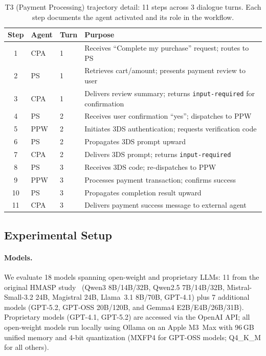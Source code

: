 \begin{table}[htbp]
    \centering
    \caption{T3 (Payment Processing) trajectory detail: 11 steps across 3 dialogue turns. Each step documents the agent activated and its role in the workflow.}
    \label{tab:t3_trajectory_detail}
    \footnotesize
    \renewcommand{\arraystretch}{1.05}
    \setlength{\tabcolsep}{1.5mm}
    \begin{tabular}{c l l p{7cm}}
        \toprule
        \textbf{Step} & \textbf{Agent} & \textbf{Turn} & \textbf{Purpose} \\
        \midrule
        1  & CPA & 1 & Receives ``Complete my purchase'' request; routes to PS \\
        2  & PS  & 1 & Retrieves cart/amount; presents payment review to user \\
        3  & CPA & 1 & Delivers review summary; returns \texttt{input-required} for confirmation \\
        4  & PS  & 2 & Receives user confirmation ``yes''; dispatches to PPW \\
        5  & PPW & 2 & Initiates 3DS authentication; requests verification code \\
        6  & PS  & 2 & Propagates 3DS prompt upward \\
        7  & CPA & 2 & Delivers 3DS prompt; returns \texttt{input-required} \\
        8  & PS  & 3 & Receives 3DS code; re-dispatches to PPW \\
        9  & PPW & 3 & Processes payment transaction; confirms success \\
        10 & PS  & 3 & Propagates completion result upward \\
        11 & CPA & 3 & Delivers payment success message to external agent \\
        \bottomrule
    \end{tabular}
\end{table}

\subsection{Experimental Setup}

\paragraph{Models.} We evaluate 18 models spanning open-weight and proprietary LLMs: 11 from the original HMASP study~\cite{huang2026hmasp} (Qwen3 8B/14B/32B, Qwen2.5 7B/14B/32B, Mistral-Small-3.2 24B, Magistral 24B, Llama~3.1 8B/70B, GPT-4.1) plus 7 additional models (GPT-5.2, GPT-OSS 20B/120B, and Gemma4 E2B/E4B/26B/31B). Proprietary models (GPT-4.1, GPT-5.2) are accessed via the OpenAI API; all open-weight models run locally using Ollama on an Apple M3~Max with 96\,GB unified memory and 4-bit quantization (MXFP4 for GPT-OSS models; Q4\_K\_M for all others).

